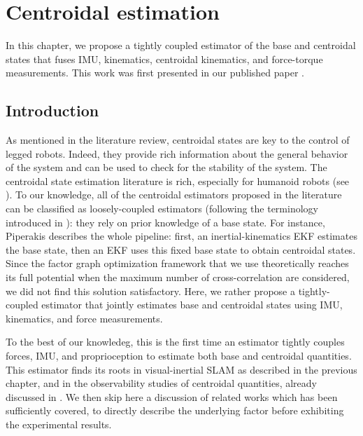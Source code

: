 \chapter{Centroidal estimation}
\label{chp:centroidal_estimation}
\minitoc
\bigskip


In this chapter, we propose a tightly coupled estimator of the base and centroidal states that fuses IMU, kinematics, centroidal kinematics, 
and force-torque measurements. This work was first presented in our published paper \cite{fourmy2021contact}.

\section{Introduction}

As mentioned in the literature review, centroidal states are key to the control of legged robots. Indeed, they provide rich information about the general
behavior of the system and can be used to check for the stability of the system. The centroidal state estimation literature is rich, especially for humanoid
robots (see ). To our knowledge, all of the centroidal estimators proposed in the literature can be classified as loosely-coupled estimators 
(following the terminology introduced in ): they rely on prior knowledge of a base state. For instance, Piperakis \cite{piperakis2018nonlinear} 
describes the whole pipeline: first, an inertial-kinematics EKF estimates the base state, then an EKF uses this fixed base state to obtain centroidal states. 
Since the factor graph optimization framework that we use theoretically reaches its full potential when the maximum number of cross-correlation
are considered, we did not find this solution satisfactory. Here, we rather propose a tightly-coupled estimator that jointly estimates
base and centroidal states using IMU, kinematics, and force measurements.



To the best of our knowledeg, this is the first time an estimator tightly couples forces, IMU, and proprioception to estimate both base and centroidal
quantities. This estimator finds its roots in visual-inertial SLAM as described in the previous chapter,
and in the observability studies of centroidal quantities, already discussed in . We then skip here a discussion of related
works which has been sufficiently covered, to directly describe the underlying factor before exhibiting the experimental results.


